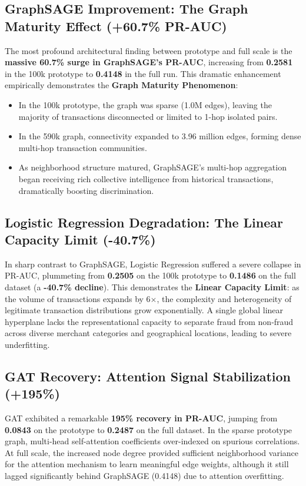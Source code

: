 \documentclass[11pt,a4paper]{report}
\begin{document}
\subsection{GraphSAGE Improvement: The Graph Maturity Effect (+60.7\% PR-AUC)}
The most profound architectural finding between prototype and full scale is the \textbf{massive 60.7\% surge in GraphSAGE's PR-AUC}, increasing from \textbf{0.2581} in the 100k prototype to \textbf{0.4148} in the full run. 
This dramatic enhancement empirically demonstrates the \textbf{Graph Maturity Phenomenon}:
\begin{itemize}
    \item In the 100k prototype, the graph was sparse (1.0M edges), leaving the majority of transactions disconnected or limited to 1-hop isolated pairs.
    \item In the 590k graph, connectivity expanded to 3.96 million edges, forming dense multi-hop transaction communities.
    \item As neighborhood structure matured, GraphSAGE's multi-hop aggregation began receiving rich collective intelligence from historical transactions, dramatically boosting discrimination.
\end{itemize}

\subsection{Logistic Regression Degradation: The Linear Capacity Limit (-40.7\%)}
In sharp contrast to GraphSAGE, Logistic Regression suffered a severe collapse in PR-AUC, plummeting from \textbf{0.2505} on the 100k prototype to \textbf{0.1486} on the full dataset (a \textbf{-40.7\% decline}). 
This demonstrates the \textbf{Linear Capacity Limit}: as the volume of transactions expands by 6$\times$, the complexity and heterogeneity of legitimate transaction distributions grow exponentially. A single global linear hyperplane lacks the representational capacity to separate fraud from non-fraud across diverse merchant categories and geographical locations, leading to severe underfitting.

\subsection{GAT Recovery: Attention Signal Stabilization (+195\%)}
GAT exhibited a remarkable \textbf{195\% recovery in PR-AUC}, jumping from \textbf{0.0843} on the prototype to \textbf{0.2487} on the full dataset. 
In the sparse prototype graph, multi-head self-attention coefficients over-indexed on spurious correlations. At full scale, the increased node degree provided sufficient neighborhood variance for the attention mechanism to learn meaningful edge weights, although it still lagged significantly behind GraphSAGE (0.4148) due to attention overfitting.
\end{document}
